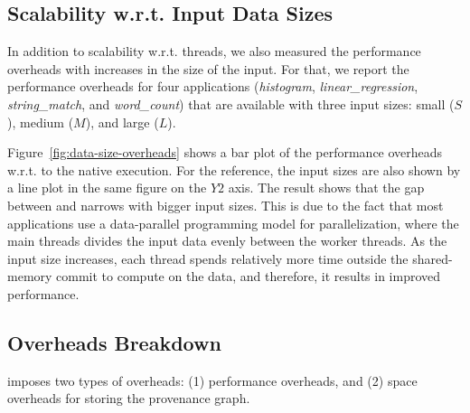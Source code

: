 
%

\subsection{Scalability w.r.t. Input Data Sizes}
\label{subsec:data-sizes-overheads}

In addition to scalability w.r.t.  threads, we also measured the performance overheads with increases in the size of the input.  For that, we
report the performance overheads for four applications ({\em histogram}, {\em linear\_regression}, {\em string\_match}, and {\em word\_count}) that are available with
three input sizes: small ($S$), medium ($M$), and large ($L$).


Figure~\ref{fig:data-size-overheads} shows a bar plot of the performance overheads w.r.t. to the native \pthreads execution. For the reference, the input sizes are also shown by a line plot in the same figure on the $Y2$ axis. The result shows that the gap between \pthreads and \projecttitle narrows with bigger input sizes. This is due to the fact that most applications use a data-parallel programming model for parallelization, where the main threads divides the input data evenly between the worker threads. As the input size increases, each thread spends relatively more time outside the shared-memory commit to compute on the data, and therefore, it results in improved performance.
 

%





\subsection{Overheads Breakdown}
\label{subsec:overheads-breakdown}

\projecttitle imposes two types of overheads: (1) performance overheads, and (2) space overheads for storing the provenance graph.



